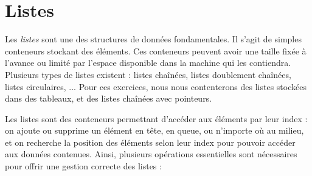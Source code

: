\documentclass[11pt,a4paper]{article}
\begin{document}
\section{Listes}

\bigskip

Les \textit{listes} sont une des structures de données fondamentales.
Il s'agit de simples conteneurs stockant des éléments.
Ces conteneurs peuvent avoir une taille fixée à l'avance ou limité par l'espace disponible dans la machine qui les contiendra.
Plusieurs types de listes existent : listes chaînées, listes doublement chaînées, listes circulaires, ...
Pour ces exercices, nous nous contenterons des listes stockées dans des tableaux, et des listes chaînées avec pointeurs.

\bigskip

Les listes sont des conteneurs permettant d'accéder aux éléments par leur index : on ajoute ou supprime un élément en tête, en queue, ou n'importe où au milieu, et on recherche la position des éléments selon leur index pour pouvoir accéder aux données contenues.
Ainsi, plusieurs opérations essentielles sont nécessaires pour offrir une gestion correcte des listes :
\end{document}
